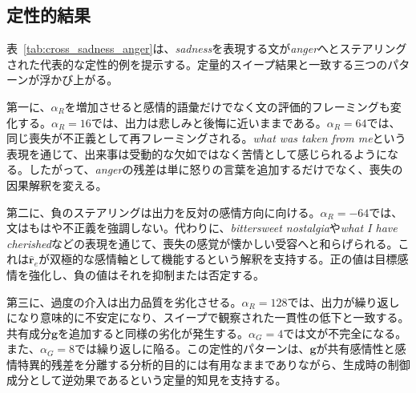 \subsection{定性的結果}
\label{sec:steering_causal_validation}

表~\ref{tab:cross_sadness_anger}は、\textit{sadness}を表現する文が\textit{anger}へとステアリングされた代表的な定性的例を提示する。定量的スイープ結果と一致する三つのパターンが浮かび上がる。\par

第一に、$\alpha_R$を増加させると感情的語彙だけでなく文の評価的フレーミングも変化する。$\alpha_R=16$では、出力は悲しみと後悔に近いままである。$\alpha_R=64$では、同じ喪失が不正義として再フレーミングされる。\textit{what was taken from me}という表現を通じて、出来事は受動的な欠如ではなく苦情として感じられるようになる。したがって、\textit{anger}の残差は単に怒りの言葉を追加するだけでなく、喪失の因果解釈を変える。\par

第二に、負のステアリングは出力を反対の感情方向に向ける。$\alpha_R=-64$では、文はもはや不正義を強調しない。代わりに、\textit{bittersweet nostalgia}や\textit{what I have cherished}などの表現を通じて、喪失の感覚が懐かしい受容へと和らげられる。これは$\hat{\mathbf{r}}_e$が双極的な感情軸として機能するという解釈を支持する。正の値は目標感情を強化し、負の値はそれを抑制または否定する。

第三に、過度の介入は出力品質を劣化させる。$\alpha_R=128$では、出力が繰り返しになり意味的に不安定になり、スイープで観察された一貫性の低下と一致する。共有成分$\mathbf{g}$を追加すると同様の劣化が発生する。$\alpha_G=4$では文が不完全になる。また、$\alpha_G=8$では繰り返しに陥る。この定性的パターンは、$\mathbf{g}$が共有感情性と感情特異的残差を分離する分析的目的には有用なままでありながら、生成時の制御成分として逆効果であるという定量的知見を支持する。

